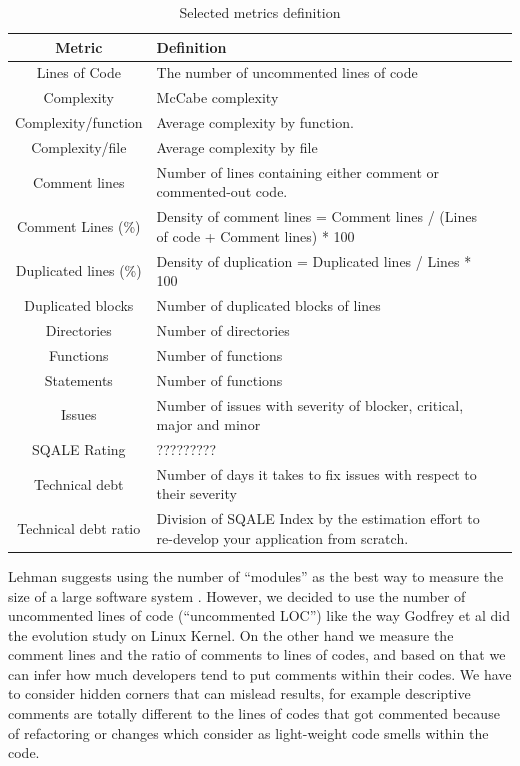 \begin{table}[!hbt]
	\begin{center}
		\caption{Selected metrics definition}
		\label{tab:metrics_definition}
		\begin{tabular}{c| l l }
			\toprule
		
			\textbf{Metric} & \textbf{Definition} \\ \midrule
			Lines of Code & The number of uncommented lines of code    \\
			Complexity      & McCabe complexity    \\
			Complexity/function & Average complexity by function. \\
			Complexity/file & Average complexity by file \\
			Comment lines  & Number of lines containing either comment or commented-out code. \\
			Comment Lines (\%)   & Density of comment lines = Comment lines / (Lines of code + Comment lines) * 100    \\
			Duplicated lines (\%)     & Density of duplication = Duplicated lines / Lines * 100    \\
			Duplicated blocks   & Number of duplicated blocks of lines    \\
			Directories   & Number of directories    \\
			Functions            & Number of functions    \\
			Statements      & Number of functions   \\
			Issues    & Number of issues with severity of blocker, critical, major and minor   \\
		SQALE Rating   & ?????????    \\
			Technical debt    & Number of days it takes to fix issues with respect to their severity    \\
			Technical debt ratio   & Division of SQALE Index by the estimation effort to re-develop your application from scratch.    \\
		\end{tabular}
	\end{center}
\end{table}



\par
Lehman suggests using the number of “modules” as the best way to measure the size of a large software system \cite{Lehman1997METRICS}. However, we decided to use the number of uncommented lines of code (“uncommented LOC”) like the way Godfrey et al \cite{Godfrey2000ICMS} did the evolution study on Linux Kernel. On the other hand we measure the comment lines and the ratio of comments to lines of codes, and based on that we can infer how much developers tend to put comments within their codes. We have to consider hidden corners that can mislead results, for example descriptive comments are totally different to the lines of codes that got commented because of refactoring or changes which consider as light-weight code smells within the code.

